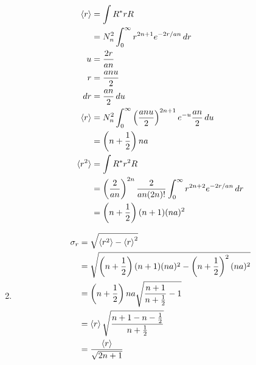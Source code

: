 \documentclass{article}
\begin{document}
\begin{enumerate}
        \begin{align*}
          \braket{r}   & = \int R^* r R                                                                                           \\
                       & = N_n^2 \int_0^\infty r^{2 n + 1} e^{-2 r / a n} \,d r                                                   \\
          u            & = \frac{2 r}{a n}                                                                                        \\
          r            & = \frac{a n u}{2}                                                                                        \\
          d r          & = \frac{a n}{2} \,d u                                                                                    \\
          \braket{r}   & = N_n^2 \int_0^\infty \left( \frac{a n u}{2} \right)^{2 n + 1} e^{-u} \frac{a n}{2} \,d u                \\
                       & = \left( n + \frac{1}{2} \right) n a                                                                     \\
          \braket{r^2} & = \int R^* r^2 R                                                                                         \\
                       & = \left( \frac{2}{a n} \right)^{2 n} \frac{2}{a n (2 n)!} \int_0^\infty r^{2 n + 2} e^{-2 r / a n} \,d r \\
                       & = \left( n + \frac{1}{2} \right) (n + 1) (n a)^2
        \end{align*}

  \item

        \begin{align*}
          \sigma_r & = \sqrt{\braket{r^2} - \braket{r}^2}                                                               \\
                   & = \sqrt{\left( n + \frac{1}{2} \right) (n + 1) (n a)^2 - \left( n + \frac{1}{2} \right)^2 (n a)^2} \\
                   & = \left( n + \frac{1}{2} \right) n a \sqrt{\frac{n + 1}{n + \frac{1}{2}} - 1}                      \\
                   & = \braket{r} \sqrt{\frac{n + 1 - n - \frac{1}{2}}{n + \frac{1}{2}}}                                \\
                   & = \frac{\braket{r}}{\sqrt{2 n + 1}}
        \end{align*}
\end{enumerate}
\end{document}
